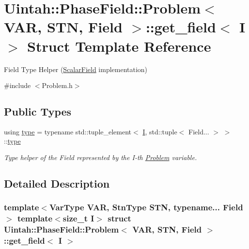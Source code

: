 \hypertarget{structUintah_1_1PhaseField_1_1Problem_1_1get__field_3_01I_01_4}{}\section{Uintah\+:\+:Phase\+Field\+:\+:Problem$<$ V\+AR, S\+TN, Field $>$\+:\+:get\+\_\+field$<$ I $>$ Struct Template Reference}
\label{structUintah_1_1PhaseField_1_1Problem_1_1get__field_3_01I_01_4}


Field Type Helper (\hyperlink{structUintah_1_1PhaseField_1_1ScalarField}{Scalar\+Field} implementation)  




{\ttfamily \#include $<$Problem.\+h$>$}

\subsection*{Public Types}
\begin{DoxyCompactItemize}
\item 
using \hyperlink{structUintah_1_1PhaseField_1_1Problem_1_1get__field_3_01I_01_4_a362caedbe580a034ff198b7369f2fc82}{type} = typename std\+::tuple\+\_\+element$<$ \hyperlink{structUintah_1_1PhaseField_1_1I}{I}, std\+::tuple$<$ Field... $>$ $>$\+::\hyperlink{structUintah_1_1PhaseField_1_1Problem_1_1get__field_3_01I_01_4_a362caedbe580a034ff198b7369f2fc82}{type}
\begin{DoxyCompactList}\small\item\em Type helper of the Field represented by the I-\/th \hyperlink{classUintah_1_1PhaseField_1_1Problem}{Problem} variable. \end{DoxyCompactList}\end{DoxyCompactItemize}


\subsection{Detailed Description}
\subsubsection*{template$<$Var\+Type V\+AR, Stn\+Type S\+TN, typename... Field$>$\newline
template$<$size\+\_\+t I$>$\newline
struct Uintah\+::\+Phase\+Field\+::\+Problem$<$ V\+A\+R, S\+T\+N, Field $>$\+::get\+\_\+field$<$ I $>$}

